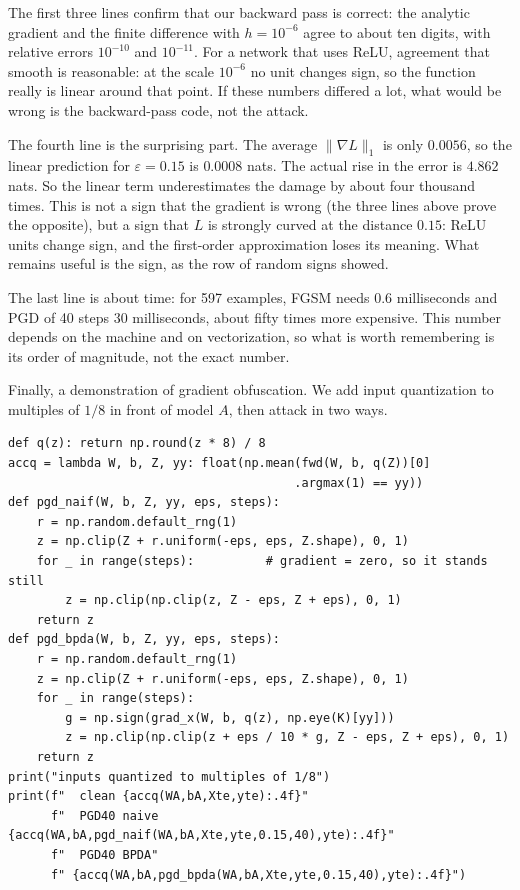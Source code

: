 The first three lines confirm that our backward pass is correct: the analytic gradient
and the finite difference with $h=10^{-6}$ agree to about ten digits, with relative
errors $10^{-10}$ and $10^{-11}$. For a network that uses ReLU, agreement that smooth
is reasonable: at the scale $10^{-6}$ no unit changes sign, so the function really is
linear around that point. If these numbers differed a lot, what would be wrong is the
backward-pass code, not the attack.

The fourth line is the surprising part. The average $\lVert\nabla L\rVert_1$ is only
$0.0056$, so the linear prediction for $\varepsilon=0.15$ is $0.0008$
nats. The actual rise in the error is $4.862$ nats. So the linear term
underestimates the damage by about four thousand times. This is not a sign that the
gradient is wrong (the three lines above prove the opposite), but a sign that $L$ is
strongly curved at the distance $0.15$: ReLU units change sign, and the first-order
approximation loses its meaning. What remains useful is the sign, as the row of random
signs showed.

The last line is about time: for 597 examples, FGSM needs $0.6$ milliseconds and
PGD of 40 steps $30$ milliseconds, about fifty times more expensive. This number
depends on the machine and on vectorization, so what is worth remembering is its
order of magnitude, not the exact number.

Finally, a demonstration of gradient obfuscation. We add input quantization to
multiples of $1/8$ in front of model $A$, then attack in two ways.

\begin{verbatim}
def q(z): return np.round(z * 8) / 8
accq = lambda W, b, Z, yy: float(np.mean(fwd(W, b, q(Z))[0]
                                        .argmax(1) == yy))
def pgd_naif(W, b, Z, yy, eps, steps):
    r = np.random.default_rng(1)
    z = np.clip(Z + r.uniform(-eps, eps, Z.shape), 0, 1)
    for _ in range(steps):          # gradient = zero, so it stands still
        z = np.clip(np.clip(z, Z - eps, Z + eps), 0, 1)
    return z
def pgd_bpda(W, b, Z, yy, eps, steps):
    r = np.random.default_rng(1)
    z = np.clip(Z + r.uniform(-eps, eps, Z.shape), 0, 1)
    for _ in range(steps):
        g = np.sign(grad_x(W, b, q(z), np.eye(K)[yy]))
        z = np.clip(np.clip(z + eps / 10 * g, Z - eps, Z + eps), 0, 1)
    return z
print("inputs quantized to multiples of 1/8")
print(f"  clean {accq(WA,bA,Xte,yte):.4f}"
      f"  PGD40 naive {accq(WA,bA,pgd_naif(WA,bA,Xte,yte,0.15,40),yte):.4f}"
      f"  PGD40 BPDA"
      f" {accq(WA,bA,pgd_bpda(WA,bA,Xte,yte,0.15,40),yte):.4f}")
\end{verbatim}


